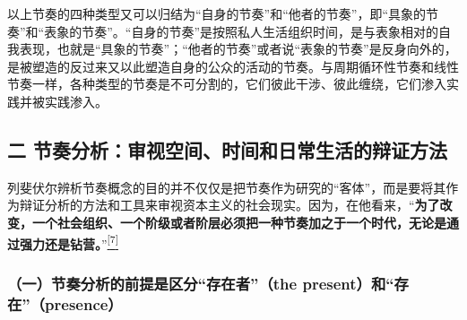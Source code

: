 \documentclass[UTF8, fontset = sourcesans, a4paper, oneside, zihao =
-4, scheme=chinese, no-math, space=true]{ctexbook}
\begin{document}
以上节奏的四种类型又可以归结为``自身的节奏''和``他者的节奏''，即``具象的节奏''和``表象的节奏''。``自身的节奏''是按照私人生活组织时间，是与表象相对的自我表现，也就是``具象的节奏''；``他者的节奏''或者说``表象的节奏''是反身向外的，是被塑造的反过来又以此塑造自身的公众的活动的节奏。与周期循环性节奏和线性节奏一样，各种类型的节奏是不可分割的，它们彼此干涉、彼此缠绕，它们渗入实践并被实践渗入。

\subsection{二
节奏分析：审视空间、时间和日常生活的辩证方法}\label{part0009_split_001.htmlux5cux23c047}

列斐伏尔辨析节奏概念的目的并不仅仅是把节奏作为研究的``客体''，而是要将其作为辩证分析的方法和工具来审视资本主义的社会现实。因为，在他看来，``\textbf{为了改变，一个社会组织、一个阶级或者阶层必须把一种节奏加之于一个时代，无论是通过强力还是钻营。}''\protect\hypertarget{part0009_split_001.htmlux5cux23w7}{}{}\protect\hyperlink{part0009_split_004.htmlux5cux23m7}{\textsuperscript{{[}7{]}}}

\subsubsection{\texorpdfstring{（一）节奏分析的前提是区分``存在者''（the
present）和``存在''（presence）}{（一）节奏分析的前提是区分存在者（the present）和存在（presence）}}\label{part0009_split_001.htmlux5cux23d027}
\end{document}
